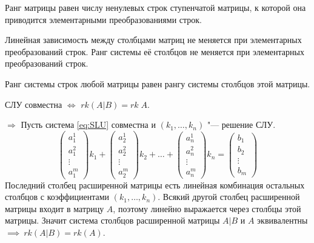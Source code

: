 \begin{theorem}
    Ранг матрицы равен числу ненулевых строк ступенчатой матрицы, к которой она приводится элементарными преобразованиями строк.
\end{theorem}

Линейная зависимость между столбцами матриц не меняется при элементарных преобразований строк. Ранг системы её столбцов не меняется при элементарных преобразований строк.

Ранг системы строк любой матрицы равен рангу системы столбцов этой матрицы.

\begin{theorem}
    СЛУ совместна $\Leftrightarrow$  $rk(A|B) = rk\;A$.
\end{theorem}
\begin{Proof}
$\Rightarrow$ Пусть система \ref{eq:SLU} совместна и $(k_1,\ldots, k_n)$ "--- решение СЛУ.
\begin{equation*}
    \begin{pmatrix}
        a_1^1 \\
        a_1^2 \\
        \vdots \\
        a_1^m
    \end{pmatrix} k_1 +
    \begin{pmatrix}
        a_2^1 \\
        a_2^2 \\
        \vdots \\
        a_2^m
    \end{pmatrix} k_2 + \ldots + 
    \begin{pmatrix}
        a_n^1 \\
        a_n^2 \\
        \vdots \\
        a_n^m
    \end{pmatrix} k_n = 
    \begin{pmatrix}
        b_1 \\
        b_2 \\
        \vdots \\
        b_m
    \end{pmatrix}
\end{equation*}
Последний столбец расширенной матрицы есть линейная комбинация остальных столбцов с коэффициентами $(k_1,\ldots,k_n)$. Всякий другой столбец расширенной матрицы входит в матрицу $A$, поэтому линейно выражается через столбцы этой матрицы. Значит система столбцов расширенной матрицы $A|B$ и $A$ эквивалентны  $\implies ~ rk(A|B) =  rk(A)$.


\end{Proof}

